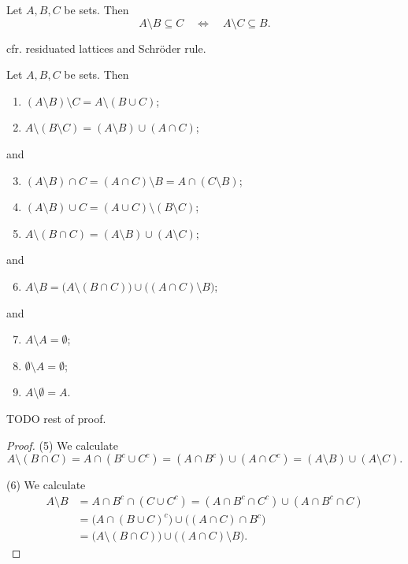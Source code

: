 \begin{proposition} \label{residuationSetBooleanLattice}
Let $A,B,C$ be sets. Then
\[ A\setminus B \subseteq C \quad\iff\quad A\setminus C\subseteq B. \]
\end{proposition}
cfr. residuated lattices and Schröder rule.


\begin{lemma} \label{differenceProperties}
Let $A,B,C$ be sets. Then
\begin{enumerate}
\item $(A\setminus B)\setminus C = A\setminus (B\cup C)$;
\item $A\setminus (B\setminus C) = (A\setminus B) \cup (A\cap C)$;
\end{enumerate}
and
\begin{enumerate} \setcounter{enumi}{2}
\item $(A\setminus B)\cap C = (A\cap C)\setminus B = A\cap (C\setminus B)$;
\item $(A\setminus B)\cup C = (A\cup C)\setminus (B\setminus C)$;
\item $A\setminus(B\cap C) = (A\setminus B)\cup (A\setminus C)$;
\end{enumerate}
and
\begin{enumerate} \setcounter{enumi}{5}
\item $A\setminus B = \big(A\setminus (B\cap C)\big) \cup \big((A\cap C)\setminus B\big)$;
\end{enumerate}
and
\begin{enumerate} \setcounter{enumi}{6}
\item $A\setminus A = \emptyset$;
\item $\emptyset\setminus A = \emptyset$;
\item $A\setminus \emptyset = A$.
\end{enumerate}
\end{lemma}
TODO rest of proof.
\begin{proof}
(5) We calculate
\[ A\setminus(B\cap C) = A\cap (B^c\cup C^c) = (A\cap B^c)\cup (A\cap C^c) = (A\setminus B)\cup (A\setminus C). \]

(6) We calculate
\begin{align*}
A\setminus B &= A\cap B^c \cap (C\cup C^c) = (A\cap B^c \cap C^c) \cup (A\cap B^c \cap C) \\
&= \big(A\cap (B\cup C)^c\big)\cup \big((A\cap C)\cap B^c\big) \\
&= \big(A\setminus (B\cap C)\big) \cup \big((A\cap C)\setminus B\big).
\end{align*}
\end{proof}

